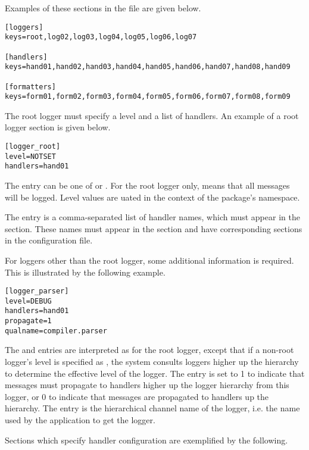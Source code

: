 Examples of these sections in the file are given below.

\begin{verbatim}
[loggers]
keys=root,log02,log03,log04,log05,log06,log07

[handlers]
keys=hand01,hand02,hand03,hand04,hand05,hand06,hand07,hand08,hand09

[formatters]
keys=form01,form02,form03,form04,form05,form06,form07,form08,form09
\end{verbatim}

The root logger must specify a level and a list of handlers. An
example of a root logger section is given below.

\begin{verbatim}
[logger_root]
level=NOTSET
handlers=hand01
\end{verbatim}

The  entry can be one of  or . For the root logger only,
 means that all messages will be logged. Level values are
uated in the context of the  package's
namespace.

The  entry is a comma-separated list of handler names,
which must appear in the \code{[handlers]} section. These names must
appear in the \code{[handlers]} section and have corresponding
sections in the configuration file.

For loggers other than the root logger, some additional information is
required. This is illustrated by the following example.

\begin{verbatim}
[logger_parser]
level=DEBUG
handlers=hand01
propagate=1
qualname=compiler.parser
\end{verbatim}

The  and  entries are interpreted as for
the root logger, except that if a non-root logger's level is specified
as , the system consults loggers higher up the hierarchy
to determine the effective level of the logger. The 
entry is set to 1 to indicate that messages must propagate to handlers
higher up the logger hierarchy from this logger, or 0 to indicate that
messages are  propagated to handlers up the hierarchy. The
 entry is the hierarchical channel name of the logger,
i.e. the name used by the application to get the logger.

Sections which specify handler configuration are exemplified by the
following.

